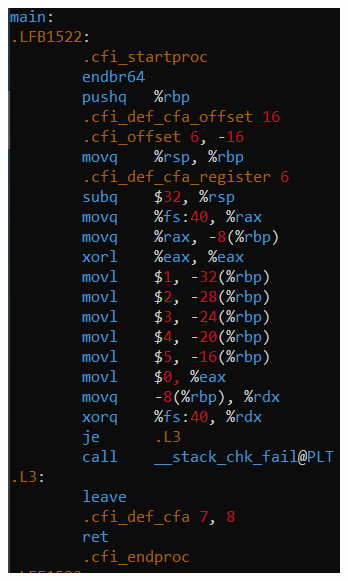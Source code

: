 \documentclass[a4paper,12pt]{article}
\begin{document}
\begin{figure}[H]
{\begin{minipage}[t]{0.4\textwidth}
        \centering
        \includegraphics[scale = 0.6]{2вCpp64.png}
    \end{minipage}}
\end{figure}
\end{document}

